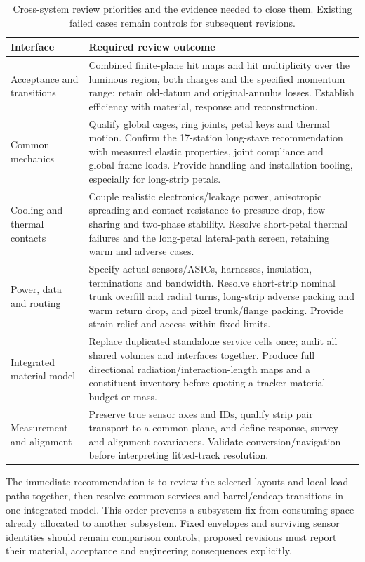 \begin{table}[!htbp]
\centering\small
\caption{Cross-system review priorities and the evidence needed to close them.
Existing failed cases remain controls for subsequent revisions.}
\label{tab:tracker-review}
\begin{tabular}{@{}>{\raggedright\arraybackslash}p{34mm}>{\raggedright\arraybackslash}p{106mm}@{}}\toprule
Interface & Required review outcome\\\midrule
Acceptance and transitions & Combined finite-plane hit maps and hit multiplicity
over the luminous region, both charges and the specified momentum range; retain
old-datum and original-annulus losses. Establish efficiency with material,
response and reconstruction.\\
Common mechanics & Qualify global cages, ring joints, petal keys and thermal
motion. Confirm the 17-station long-stave recommendation with measured elastic
properties, joint compliance and global-frame loads. Provide handling and
installation tooling, especially for long-strip petals.\\
Cooling and thermal contacts & Couple realistic electronics/leakage power,
anisotropic spreading and contact resistance to pressure drop, flow sharing and
two-phase stability. Resolve short-petal thermal failures and the long-petal
lateral-path screen, retaining warm and adverse cases.\\
Power, data and routing & Specify actual sensors/ASICs, harnesses, insulation,
terminations and bandwidth. Resolve short-strip nominal trunk overfill and
radial turns, long-strip adverse packing and warm return drop, and pixel
trunk/flange packing. Provide strain relief and access within fixed limits.\\
Integrated material model & Replace duplicated standalone service cells once;
audit all shared volumes and interfaces together. Produce full directional
radiation/interaction-length maps and a constituent inventory before quoting a
tracker material budget or mass.\\
Measurement and alignment & Preserve true sensor axes and IDs, qualify strip
pair transport to a common plane, and define response, survey and alignment
covariances. Validate conversion/navigation before interpreting fitted-track
resolution.\\\bottomrule
\end{tabular}
\end{table}

The immediate recommendation is to review the selected layouts and local load
paths together, then resolve common services and barrel/endcap transitions in
one integrated model. This order prevents a subsystem fix from consuming space
already allocated to another subsystem. Fixed envelopes and surviving sensor
identities should remain comparison controls; proposed revisions must report
their material, acceptance and engineering consequences explicitly.

